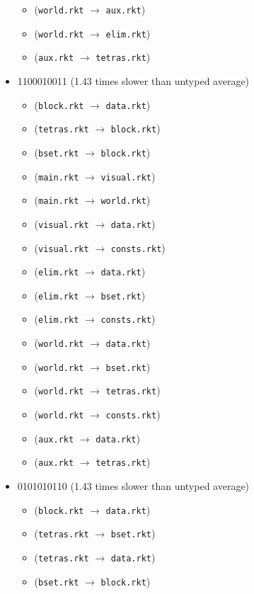 \documentclass{article}
\newcommand{\mono}[1]{\texttt{#1}}
\begin{document}
\begin{itemize}
\begin{itemize}
  \item (\mono{world.rkt} $\rightarrow$ \mono{aux.rkt})
  \item (\mono{world.rkt} $\rightarrow$ \mono{elim.rkt})
  \item (\mono{aux.rkt} $\rightarrow$ \mono{tetras.rkt})
  \end{itemize}
\item 1100010011 (1.43 times slower than untyped average)
  \begin{itemize}
  \item (\mono{block.rkt} $\rightarrow$ \mono{data.rkt})
  \item (\mono{tetras.rkt} $\rightarrow$ \mono{block.rkt})
  \item (\mono{bset.rkt} $\rightarrow$ \mono{block.rkt})
  \item (\mono{main.rkt} $\rightarrow$ \mono{visual.rkt})
  \item (\mono{main.rkt} $\rightarrow$ \mono{world.rkt})
  \item (\mono{visual.rkt} $\rightarrow$ \mono{data.rkt})
  \item (\mono{visual.rkt} $\rightarrow$ \mono{consts.rkt})
  \item (\mono{elim.rkt} $\rightarrow$ \mono{data.rkt})
  \item (\mono{elim.rkt} $\rightarrow$ \mono{bset.rkt})
  \item (\mono{elim.rkt} $\rightarrow$ \mono{consts.rkt})
  \item (\mono{world.rkt} $\rightarrow$ \mono{data.rkt})
  \item (\mono{world.rkt} $\rightarrow$ \mono{bset.rkt})
  \item (\mono{world.rkt} $\rightarrow$ \mono{tetras.rkt})
  \item (\mono{world.rkt} $\rightarrow$ \mono{consts.rkt})
  \item (\mono{aux.rkt} $\rightarrow$ \mono{data.rkt})
  \item (\mono{aux.rkt} $\rightarrow$ \mono{tetras.rkt})
  \end{itemize}
\item 0101010110 (1.43 times slower than untyped average)
  \begin{itemize}
  \item (\mono{block.rkt} $\rightarrow$ \mono{data.rkt})
  \item (\mono{tetras.rkt} $\rightarrow$ \mono{bset.rkt})
  \item (\mono{tetras.rkt} $\rightarrow$ \mono{data.rkt})
  \item (\mono{bset.rkt} $\rightarrow$ \mono{block.rkt})

\end{itemize}
\end{itemize}
\end{document}
